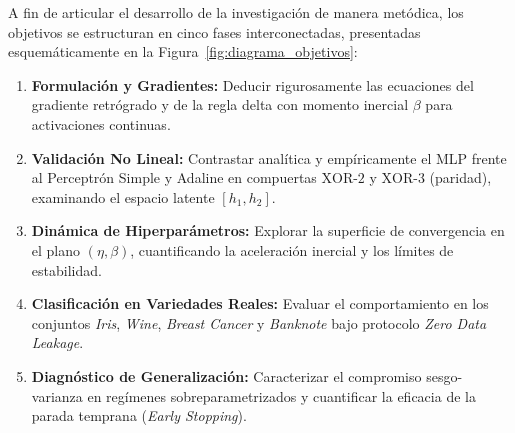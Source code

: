 \documentclass[11pt,letterpaper]{article}
\begin{document}
A fin de articular el desarrollo de la investigación de manera metódica, los objetivos se estructuran en cinco fases interconectadas, presentadas esquemáticamente en la Figura~\ref{fig:diagrama_objetivos}:
\begin{enumerate}
    \item \textbf{Formulación y Gradientes:} Deducir rigurosamente las ecuaciones del gradiente retrógrado y de la regla delta con momento inercial $\beta$ para activaciones continuas.
    \item \textbf{Validación No Lineal:} Contrastar analítica y empíricamente el MLP frente al Perceptrón Simple y Adaline en compuertas $\text{XOR-2}$ y $\text{XOR-3}$ (paridad), examinando el espacio latente $[h_1, h_2]$.
    \item \textbf{Dinámica de Hiperparámetros:} Explorar la superficie de convergencia en el plano $(\eta, \beta)$, cuantificando la aceleración inercial y los límites de estabilidad.
    \item \textbf{Clasificación en Variedades Reales:} Evaluar el comportamiento en los conjuntos \textit{Iris}, \textit{Wine}, \textit{Breast Cancer} y \textit{Banknote} bajo protocolo \textit{Zero Data Leakage}.
    \item \textbf{Diagnóstico de Generalización:} Caracterizar el compromiso sesgo-varianza en regímenes sobreparametrizados y cuantificar la eficacia de la parada temprana (\textit{Early Stopping}).
\end{enumerate}
\end{document}
